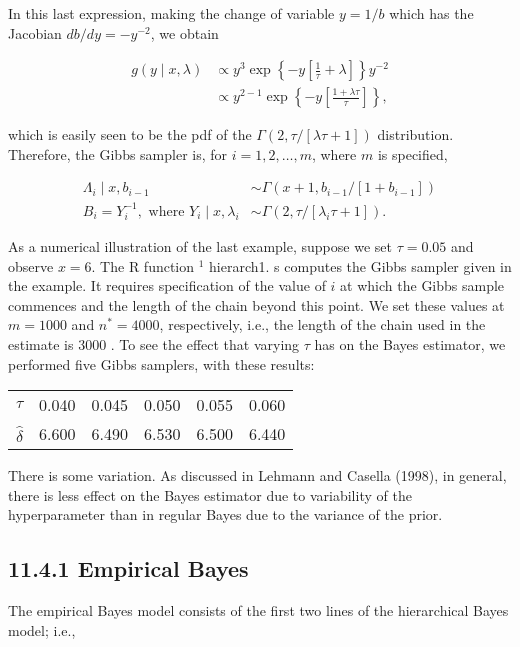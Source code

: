 In this last expression, making the change of variable $y=1 / b$ which has the Jacobian $d b / d y=-y^{-2}$, we obtain

$$
\begin{aligned}
g(y \mid x, \lambda) & \propto y^{3} \exp \left\{-y\left[\frac{1}{\tau}+\lambda\right]\right\} y^{-2} \\
& \propto y^{2-1} \exp \left\{-y\left[\frac{1+\lambda \tau}{\tau}\right]\right\},
\end{aligned}
$$

which is easily seen to be the pdf of the $\Gamma(2, \tau /[\lambda \tau+1])$ distribution. Therefore, the Gibbs sampler is, for $i=1,2, \ldots, m$, where $m$ is specified,

$$
\begin{aligned}
\Lambda_{i} \mid x, b_{i-1} & \sim \Gamma\left(x+1, b_{i-1} /\left[1+b_{i-1}\right]\right) \\
B_{i}=Y_{i}^{-1}, \text { where } Y_{i} \mid x, \lambda_{i} & \sim \Gamma\left(2, \tau /\left[\lambda_{i} \tau+1\right]\right) .
\end{aligned}
$$

As a numerical illustration of the last example, suppose we set $\tau=0.05$ and observe $x=6$. The R function ${ }^{1}$ hierarch1. s computes the Gibbs sampler given in the example. It requires specification of the value of $i$ at which the Gibbs sample commences and the length of the chain beyond this point. We set these values at $m=1000$ and $n^{*}=4000$, respectively, i.e., the length of the chain used in the estimate is 3000 . To see the effect that varying $\tau$ has on the Bayes estimator, we performed five Gibbs samplers, with these results:

\begin{center}
\begin{tabular}{|c|ccccc|}
\hline
$\tau$ & 0.040 & 0.045 & 0.050 & 0.055 & 0.060 \\
$\hat{\delta}$ & 6.600 & 6.490 & 6.530 & 6.500 & 6.440 \\
\hline
\end{tabular}
\end{center}

There is some variation. As discussed in Lehmann and Casella (1998), in general, there is less effect on the Bayes estimator due to variability of the hyperparameter than in regular Bayes due to the variance of the prior.

\subsection*{11.4.1 Empirical Bayes}
The empirical Bayes model consists of the first two lines of the hierarchical Bayes model; i.e.,


